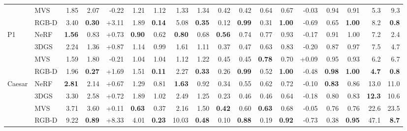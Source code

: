 \begin{tabular}{llrrrrrrrrrrrrrrrr}
 & MVS & 1.85 & 2.07 & -0.22 & 1.21 & 1.12 & 1.33 & 1.34 & 0.42 & 0.42 & 0.64 & 0.67 & -0.03 & 0.94 & 0.91 & 5.3 & 9.3 \\
 & RGB-D & 3.40 & \textbf{0.30} & +3.11 & 1.89 & \textbf{0.14} & 5.08 & \textbf{0.35} & 0.12 & \textbf{0.99} & 0.31 & \textbf{1.00} & -0.69 & 0.65 & \textbf{1.00} & 8.2 & \textbf{0.8} \\
\midrule
\multirow{4}{*}{P1} & NeRF & \textbf{1.56} & 0.83 & +0.73 & \textbf{0.90} & 0.62 & \textbf{0.80} & 0.68 & \textbf{0.56} & 0.74 & 0.77 & 0.93 & -0.17 & 0.91 & 1.00 & 7.2 & 2.4 \\
 & 3DGS & 2.24 & 1.36 & +0.87 & 1.14 & 0.99 & 1.61 & 1.11 & 0.37 & 0.47 & 0.63 & 0.83 & -0.20 & 0.87 & 0.97 & 7.5 & 4.7 \\
 & MVS & 1.59 & 1.80 & -0.21 & 1.04 & 1.04 & 1.12 & 1.22 & 0.45 & 0.45 & \textbf{0.78} & 0.70 & +0.09 & 0.95 & 0.93 & 6.2 & 6.7 \\
 & RGB-D & 1.96 & \textbf{0.27} & +1.69 & 1.51 & \textbf{0.11} & 2.27 & \textbf{0.33} & 0.26 & \textbf{0.99} & 0.52 & \textbf{1.00} & -0.48 & \textbf{0.98} & \textbf{1.00} & \textbf{4.7} & \textbf{0.8} \\
\midrule
\multirow{4}{*}{Caesar} & NeRF & \textbf{2.81} & 2.14 & +0.67 & 1.29 & 0.81 & \textbf{1.63} & 0.92 & 0.34 & 0.55 & 0.62 & 0.72 & -0.10 & \textbf{0.83} & 0.86 & 13.0 & 11.0 \\
 & 3DGS & 3.30 & 2.58 & +0.72 & 1.89 & 1.02 & 2.49 & 1.25 & 0.23 & 0.46 & 0.46 & 0.64 & -0.18 & 0.80 & 0.83 & \textbf{12.3} & 10.6 \\
 & MVS & 3.71 & 3.60 & +0.11 & \textbf{0.63} & 0.37 & 2.16 & 1.50 & \textbf{0.42} & 0.60 & \textbf{0.63} & 0.68 & -0.05 & 0.76 & 0.76 & 22.6 & 23.5 \\
 & RGB-D & 9.22 & \textbf{0.89} & +8.33 & 4.01 & \textbf{0.23} & 10.03 & \textbf{0.48} & 0.10 & \textbf{0.88} & 0.19 & \textbf{0.92} & -0.73 & 0.38 & \textbf{0.95} & 47.1 & \textbf{8.7} \\
\bottomrule
\end{tabular}
